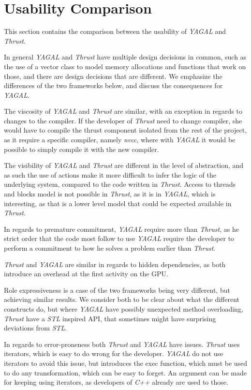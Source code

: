 \section{Usability Comparison} \label{sec:comparisoncomparison}
This section contains the comparison between the usability of \textit{YAGAL} and \textit{Thrust}. 

In general \textit{YAGAL} and \textit{Thrust} have multiple design decisions in common, such as the use of a vector class to model memory allocations and functions that work on those, and there are design decisions that are different. We emphasize the differences of the two frameworks below, and discuss the consequences for \textit{YAGAL}.

The viscosity of \textit{YAGAL} and \textit{Thrust} are similar, with an exception in regards to changes to the compiler. If the developer of \textit{Thrust} need to change compiler, she would have to compile the thrust component isolated from the rest of the project, as it require a specific compiler, namely \textit{nvcc}, where with \textit{YAGAL} it would be possible to simply compile it with the new compiler.

The visibility of \textit{YAGAL} and \textit{Thrust} are different in the level of abstraction, and as such the use of actions make it more difficult to infer the logic of the underlying system, compared to the code written in \textit{Thrust}. Access to threads and blocks model is not possible in \textit{Thrust}, as it is in \textit{YAGAL}, which is interesting, as that is a lower level model that could be expected available in \textit{Thrust}.

In regards to premature commitment, \textit{YAGAL} require more than \textit{Thrust}, as he strict order that the code most follow to use \textit{YAGAL} require the developer to perform a commitment to how he solves a problem earlier than \textit{Thrust}.

\textit{Thrust} and \textit{YAGAL} are similar in regards to hidden dependencies, as both introduce an overhead at the first activity on the GPU.

Role expressiveness is a case of the two frameworks being very different, but achieving similar results. We consider both to be clear about what the different constructs do, but where \textit{YAGAL} have possibly unexpected method overloading, \textit{Thrust} have a \textit{STL} inspired API, that sometimes might have surprising deviations from \textit{STL}.

In regards to error-proneness both \textit{Thrust} and \textit{YAGAL} have issues. \textit{Thrust} uses iterators, which is easy to do wrong for the developer. \textit{YAGAL} do not use iterators to avoid this issue, but introduces the exec function, which must be used to do any transformation, which can be easy to forget. An argument can be made for keeping using iterators, as developers of \textit{C++} already are used to those.

